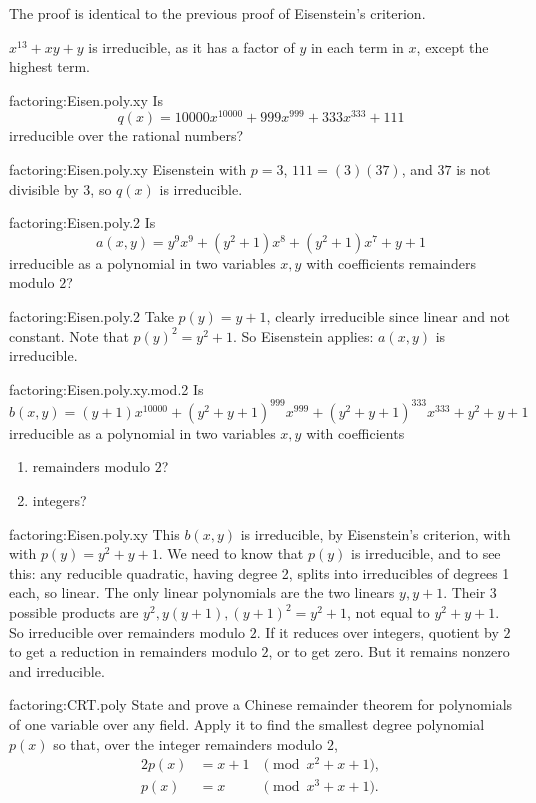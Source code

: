 The proof is identical to the previous proof of Eisenstein's criterion.
\begin{example}
\(x^{13}+xy+y\) is irreducible, as it has a factor of \(y\) in each term in \(x\), except the highest term.
\end{example}
\begin{problem}{factoring:Eisen.poly.xy}
Is
\[
q(x)=10000x^{10000}+999x^{999}+333x^{333}+111
\]
irreducible over the rational numbers?
\end{problem}
\begin{answer}{factoring:Eisen.poly.xy}
Eisenstein with \(p=3\), \(111=(3)(37)\), and \(37\) is not divisible by 3, so \(q(x)\) is irreducible.
\end{answer}
\begin{problem}{factoring:Eisen.poly.2}
Is 
\[
a(x,y)=y^9x^9+(y^2+1)x^8+(y^2+1)x^7+y+1
\]
irreducible as a polynomial in two variables \(x,y\) with coefficients remainders modulo \(2\)?
\end{problem}
\begin{answer}{factoring:Eisen.poly.2}
Take \(p(y)=y+1\), clearly irreducible since linear and not constant.
Note that \(p(y)^2=y^2+1\).
So Eisenstein applies: \(a(x,y)\) is irreducible.
\end{answer}
\begin{problem}{factoring:Eisen.poly.xy.mod.2}
Is
\[
b(x,y)=(y+1)x^{10000}+(y^2+y+1)^{999}x^{999}+(y^2+y+1)^{333}x^{333}+y^2+y+1
\]
irreducible as a polynomial in two variables \(x,y\) with coefficients 
\begin{enumerate}
\item remainders modulo \(2\)?  
\item integers?
\end{enumerate}
\end{problem}
\begin{answer}{factoring:Eisen.poly.xy}
This \(b(x,y)\) is irreducible, by Eisenstein's criterion, with with \(p(y)=y^2+y+1\).
We need to know that \(p(y)\) is irreducible, and to see this: any reducible quadratic, having degree 2, splits into irreducibles of degrees 1 each, so linear.
The only linear polynomials are the two linears \(y,y+1\).
Their 3 possible products are \(y^2,y(y+1),(y+1)^2=y^2+1\), not equal to \(y^2+y+1\).
So irreducible over remainders modulo \(2\).
If it reduces over integers, quotient by \(2\) to get a reduction in remainders modulo \(2\), or to get zero.
But it remains nonzero and irreducible.
\end{answer}
\begin{problem}{factoring:CRT.poly}
State and prove a Chinese remainder theorem for polynomials of one variable over any field.
Apply it to find the smallest degree polynomial \(p(x)\) so that, over the integer remainders modulo \(2\),
\begin{alignat*}{2}
p(x) &= x+1 &\pmod{x^2+x+1}, \\
p(x) &= x   &\pmod{x^3+x+1}.
\end{alignat*}
\end{problem}
